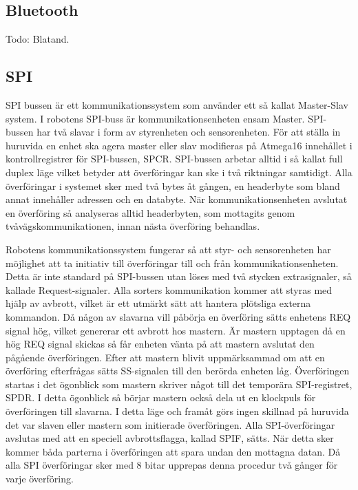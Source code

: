 \subsection{Bluetooth}
Todo: Blatand.

\subsection{SPI}
\label{sec:SPI}
SPI bussen är ett kommunikationssystem som använder ett så kallat 
Master-Slav system. I robotens SPI-buss är kommunikationsenheten ensam Master.
SPI-bussen har två slavar i form av styrenheten och sensorenheten. För att 
ställa in huruvida en enhet ska agera master eller slav modifieras på Atmega16 
innehållet i kontrollregistrer för SPI-bussen, SPCR. SPI-bussen arbetar alltid 
i så kallat full duplex läge vilket betyder att överföringar kan ske i två 
riktningar samtidigt. Alla överföringar i systemet sker med två bytes åt 
gången, en headerbyte som bland annat innehåller adressen och en databyte. 
När kommunikationsenheten avslutat en överföring så analyseras alltid 
headerbyten, som mottagits genom tvåvägskommunikationen, innan nästa 
överföring behandlas.  


Robotens kommunikationssystem fungerar så att styr- och sensorenheten har 
möjlighet att ta initiativ till överföringar till och från 
kommunikationsenheten. Detta är inte standard på SPI-bussen utan löses med två 
stycken extrasignaler, så kallade Request-signaler. Alla sorters kommunikation 
kommer att styras med hjälp av avbrott, vilket är ett utmärkt sätt att hantera 
plötsliga externa kommandon. Då någon av slavarna vill påbörja en överföring 
sätts enhetens REQ signal hög, vilket genererar ett avbrott hos mastern. Är 
mastern upptagen då en hög REQ signal skickas så får enheten vänta på att 
mastern avslutat den pågående överföringen. Efter att mastern blivit 
uppmärksammad om att en överföring efterfrågas sätts SS-signalen till den 
berörda enheten låg. Överföringen startas i det ögonblick som mastern skriver 
något till det temporära SPI-registret, SPDR. I detta ögonblick så börjar 
mastern också dela ut en klockpuls för överföringen till slavarna. I detta 
läge och framåt görs ingen skillnad på huruvida det var slaven eller mastern 
som initierade överföringen. Alla SPI-överföringar avslutas med att en speciell
avbrottsflagga, kallad SPIF, sätts. När detta sker kommer båda parterna i 
överföringen att spara undan den mottagna datan. Då alla SPI överföringar sker 
med 8 bitar upprepas denna procedur två gånger för varje överföring.

